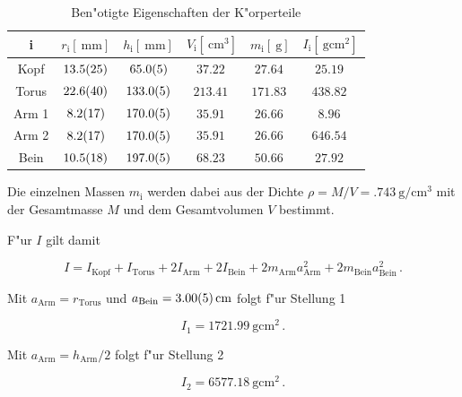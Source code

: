 				\begin{table}[h!]
					\begin{center}
						\label{tabelle:puppenradien}
						\caption{Ben"otigte Eigenschaften der K"orperteile}
						\begin{tabular}{|c||c|c|c|c|c|}
							\hline
								i &
								$r_\mathrm{i} [\SI{}{\milli \meter}]$ &
								$h_\mathrm{i} [\SI{}{\milli \meter}]$ &
								$V_\mathrm{i} [\SI{}{\centi \meter \cubed}]$ &
								$m_\mathrm{i} [\SI{}{\gram}]$ &
								$I_\mathrm{i} [\SI{}{\gram \centi \meter \squared}]$ \\
							\hline 
							\hline
								Kopf &
								$\SI{13.5 (25)}{} $ &
								$\SI{65.0 (5)}{}$ &
								$\SI{37.22}{}$&
								$\SI{27.64}{}$&
								$\SI{25.19}{}$\\
							\hline 
								Torus &
								$\SI{22.6 (40)}{} $ &
								$\SI{133.0 (5)}{}$ &
								$\SI{213.41}{}$&
								$\SI{171.83}{}$&
								$\SI{438.82}{}$\\
							\hline 
								Arm 1 &
								$\SI{8.2 (17)}{}$ &
								$\SI{170.0 (5)}{}$ &
								$\SI{35.91}{}$&
								$\SI{26.66}{}$&
								$\SI{8.96}{}$\\
							\hline 
								Arm 2 &
								$\SI{8.2 (17)}{}$ &
								$\SI{170.0 (5)}{}$ &
								$\SI{35.91}{}$&
								$\SI{26.66}{}$&
								$\SI{646.54}{}$\\
							\hline 
								Bein &
								$\SI{10.5 (18)}{}  $& 
								$\SI{197.0 (5)}{}$ &
								$\SI{68.23}{}$&
								$\SI{50.66}{}$&
								$\SI{27.92}{}$\\
							\hline 
						\end{tabular}
					\end{center}
				\end{table}

				Die einzelnen Massen $m_\mathrm{i}$ werden dabei aus der Dichte $\rho = M / V = \SI{.743}{\gram \per \centi \meter \cubed}$ mit der Gesamtmasse $M$ und dem Gesamtvolumen $V$ bestimmt.

				F"ur $I$ gilt damit

				\begin{equation*}
					I = I_\mathrm{Kopf} + I_\mathrm{Torus} + 2 I_\mathrm{Arm} + 2 I_\mathrm{Bein} + 2 m_\mathrm{Arm}a_\mathrm{Arm}^2 + 2 m_\mathrm{Bein}a_\mathrm{Bein}^2 \,.
				\end{equation*}

				Mit $a_\mathrm{Arm} = r_\mathrm{Torus}$ und $a_\mathrm{Bein} = \SI{3.00 (5)}{\centi \meter}$ folgt f"ur Stellung 1

				\begin{equation*}
					I_1 = \SI{1721.99}{\gram \centi \meter \squared} \,.
				\end{equation*}

				Mit $a_\mathrm{Arm} = h_\mathrm{Arm} / 2$ folgt f"ur Stellung 2

				\begin{equation*}
					I_2 = \SI{6577.18}{\gram \centi \meter \squared} \,.
				\end{equation*}
